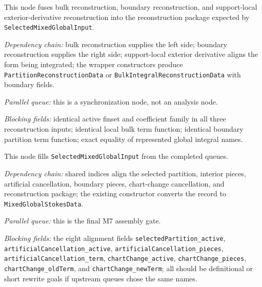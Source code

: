 \begin{definition}
  \label{obl:m7_reconstruction_data_fusion}
  This node fuses bulk reconstruction, boundary reconstruction, and
  support-local exterior-derivative reconstruction into the reconstruction
  package expected by \texttt{SelectedMixedGlobalInput}.

  \emph{Dependency chain:}
  bulk reconstruction supplies the left side; boundary reconstruction supplies
  the right side; support-local exterior derivative aligns the form being
  integrated; the wrapper constructors produce \texttt{PartitionReconstructionData}
  or \texttt{BulkIntegralReconstructionData} with boundary fields.

  \emph{Parallel queue:}
  this is a synchronization node, not an analysis node.

  \emph{Blocking fields:}
  identical active finset and coefficient family in all three reconstruction
  inputs; identical local bulk term function; identical boundary partition term
  function; exact equality of represented global integral names.
\end{definition}

\begin{theorem}
  \label{obl:m7_selected_mixed_input_fields}
  This node fills \texttt{SelectedMixedGlobalInput} from the completed queues.

  \emph{Dependency chain:}
  shared indices align the selected partition, interior pieces, artificial
  cancellation, boundary pieces, chart-change cancellation, and reconstruction
  package; the existing constructor converts the record to
  \texttt{MixedGlobalStokesData}.

  \emph{Parallel queue:}
  this is the final M7 assembly gate.

  \emph{Blocking fields:}
  the eight alignment fields
  \texttt{selectedPartition\_active},
  \texttt{artificialCancellation\_active},
  \texttt{artificialCancellation\_pieces},
  \texttt{artificialCancellation\_term},
  \texttt{chartChange\_active},
  \texttt{chartChange\_pieces},
  \texttt{chartChange\_oldTerm}, and
  \texttt{chartChange\_newTerm}; all should be definitional or short rewrite
  goals if upstream queues chose the same names.
\end{theorem}


